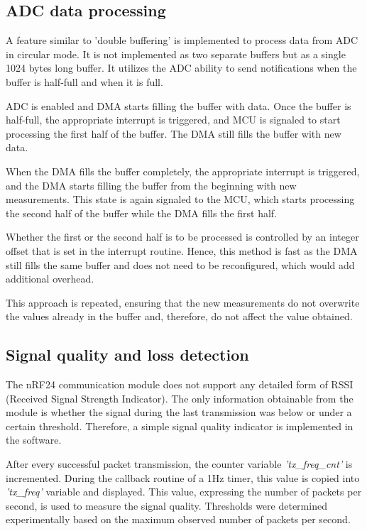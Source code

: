 \subsection{ADC data processing}
\label{sub:adc}
A feature similar to 'double buffering' is implemented to process data from ADC in circular mode. It is not implemented as two separate buffers but as a single 1024 bytes long buffer. It utilizes the ADC ability to send notifications when the buffer is half-full and when it is full.

ADC is enabled and DMA starts filling the buffer with data. Once the buffer is half-full, the appropriate interrupt is triggered, and MCU is signaled to start processing the first half of the buffer. The DMA still fills the buffer with new data.

When the DMA fills the buffer completely, the appropriate interrupt is triggered, and the DMA starts filling the buffer from the beginning with new measurements. This state is again signaled to the MCU, which starts processing the second half of the buffer while the DMA fills the first half.

Whether the first or the second half is to be processed is controlled by an integer offset that is set in the interrupt routine. Hence, this method is fast as the DMA still fills the same buffer and does not need to be reconfigured, which would add additional overhead.

This approach is repeated, ensuring that the new measurements do not overwrite the values already in the buffer and, therefore, do not affect the value obtained.

\subsection{Signal quality and loss detection}
\label{sub:tx_sig_loss}
The nRF24 communication module does not support any detailed form of RSSI (Received Signal Strength Indicator). The only information obtainable from the module is whether the signal during the last transmission was below or under a certain threshold. Therefore, a simple signal quality indicator is implemented in the software.

After every successful packet transmission, the counter variable \textit{'tx\_freq\_cnt'} is incremented. During the callback routine of a 1Hz timer, this value is copied into \textit{'tx\_freq'} variable and displayed. This value, expressing the number of packets per second, is used to measure the signal quality. Thresholds were determined experimentally based on the maximum observed number of packets per second.

